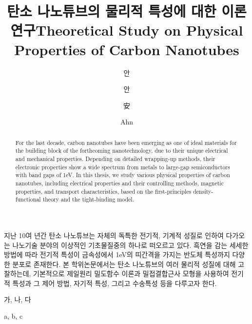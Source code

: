 \documentclass[master,english,final]{kaist-ucs} %
\title[korean]{탄소 나노튜브의 물리적 특성에 대한 이론 연구}
\title[english]{Theoretical Study on Physical Properties of
                Carbon Nanotubes}
\author[korean]{안}{진 현}
\author[korean2]{안}{진현}    %
\author[chinese]{安}{眞 玄}
\author[english]{Ahn}{Jin-Hyun}
\begin{document}

   \thesisinfo
   
    \begin{summary}      
    지난 10여 년간 탄소 나노튜브는 자체의 독특한 전기적, 기계적 성질로
    인하여 다가오는 나노기술 분야의 이상적인 기초물질중의 하나로 떠오르고
    있다. 흑연을 감는 세세한 방법에 따라 전기적 특성이 금속성에서 1eV의
    띠간격을 가지는 반도체 특성까지 다양한 분포로 존재한다.
    본 학위논문에서는 탄소 나노튜브의 여러 물리적 성질에 대해 고찰하는데,
    기본적으로 제일원리 밀도함수 이론과 밀접결합근사 모형을 사용하여 전기적
    특성과 그 제어 방법, 자기적 특성, 그리고 수송특성 등을 다루고자 한다.
    \end{summary}
   
    \begin{Korkeyword}
     가, 나, 다
    \end{Korkeyword}


    \begin{abstract}
        For the last decade, carbon nanotubes have been emerging as one
        of ideal materials for the building block of the forthcoming
        nanotechnology, due to their unique electrical and mechanical
        properties. Depending on detailed wrapping-up methods, their
        electronic properties show a wide spectrum from metals to
        large-gap semiconductors with band gaps of 1eV.
        In this thesis, we study various physical properties of carbon
        nanotubes, including electrical properties and their controlling
        methods, magnetic properties, and transport characteristics,
        based on the first-principles density-functional theory and
        the tight-binding model.
    \end{abstract} 
     
     \begin{Engkeyword}
     a, b, c
    \end{Engkeyword}
    
\end{document}
